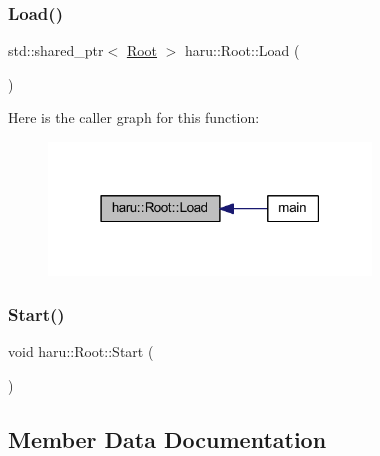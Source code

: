 \mbox{\label{classharu_1_1_root_a99a344889111b264e42a1ad724a5ceae}} 
\subsubsection{\texorpdfstring{Load()}{Load()}}
{\footnotesize\ttfamily std\+::shared\+\_\+ptr$<$ \mbox{\hyperlink{classharu_1_1_root}{Root}} $>$ haru\+::\+Root\+::\+Load (\begin{DoxyParamCaption}{ }\end{DoxyParamCaption})\hspace{0.3cm}{\ttfamily [static]}}

Here is the caller graph for this function\+:
\nopagebreak
\begin{figure}[H]
\begin{center}
\leavevmode
\includegraphics[width=243pt]{classharu_1_1_root_a99a344889111b264e42a1ad724a5ceae_icgraph}
\end{center}
\end{figure}
\mbox{\label{classharu_1_1_root_aedc20d4891295ccb1129a5b386a7906b}} 
\subsubsection{\texorpdfstring{Start()}{Start()}}
{\footnotesize\ttfamily void haru\+::\+Root\+::\+Start (\begin{DoxyParamCaption}{ }\end{DoxyParamCaption})}



\subsection{Member Data Documentation}
\mbox{\label{classharu_1_1_root_a5e251a25155fd4cb55b488b6520e1bd4}} 
